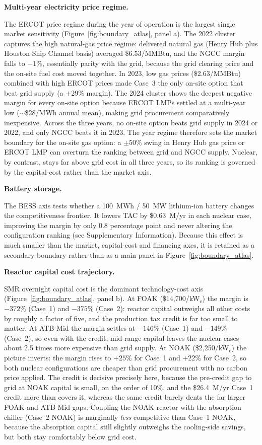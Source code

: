\documentclass[a4paper,fleqn]{cas-sc}
\newcommand{\runinhead}[1]{\par\smallskip\noindent\textbf{#1.}\quad}
\begin{document}
\runinhead{Multi-year electricity price regime}
\label{sec:results:year}

The ERCOT price regime during the year of operation is the largest single market sensitivity (Figure~\ref{fig:boundary_atlas}, panel a). The 2022 cluster captures the high natural-gas price regime: delivered natural gas (Henry Hub plus Houston Ship Channel basis) averaged \$6.53/MMBtu, and the NGCC margin falls to $-1\%$, essentially parity with the grid, because the grid clearing price and the on-site fuel cost moved together. In 2023, low gas prices (\$2.63/MMBtu) combined with high ERCOT prices made Case~3 the only on-site option that beat grid supply (a $+29\%$ margin). The 2024 cluster shows the deepest negative margin for every on-site option because ERCOT LMPs settled at a multi-year low ($\sim$\$28/MWh annual mean), making grid procurement comparatively inexpensive. Across the three years, no on-site option beats grid supply in 2024 or 2022, and only NGCC beats it in 2023. The year regime therefore sets the market boundary for the on-site gas option: a $\pm 50\%$ swing in Henry Hub gas price or ERCOT LMP can overturn the ranking between grid and NGCC supply. Nuclear, by contrast, stays far above grid cost in all three years, so its ranking is governed by the capital-cost rather than the market axis.

\runinhead{Battery storage}
\label{sec:results:bess}

The BESS axis tests whether a 100~MWh / 50~MW lithium-ion battery changes the competitiveness frontier. It lowers TAC by \$0.63~M/yr in each nuclear case, improving the margin by only 0.8 percentage point and never altering the configuration ranking (see Supplementary Information). Because this effect is much smaller than the market, capital-cost and financing axes, it is retained as a secondary boundary rather than as a main panel in Figure~\ref{fig:boundary_atlas}.

\runinhead{Reactor capital cost trajectory}
\label{sec:results:capex}

SMR overnight capital cost is the dominant technology-cost axis (Figure~\ref{fig:boundary_atlas}, panel b). At FOAK (\$14{,}700/kW$_\mathrm{e}$) the margin is $-372\%$ (Case~1) and $-375\%$ (Case~2): reactor capital outweighs all other costs by roughly a factor of five, and the production tax credit is far too small to matter. At ATB-Mid the margin settles at $-146\%$ (Case~1) and $-149\%$ (Case~2), so even with the credit, mid-range capital leaves the nuclear cases about 2.5 times more expensive than grid supply. At NOAK (\$2{,}250/kW$_\mathrm{e}$) the picture inverts: the margin rises to $+25\%$ for Case~1 and $+22\%$ for Case~2, so both nuclear configurations are cheaper than grid procurement with no carbon price applied. The credit is decisive precisely here, because the pre-credit gap to grid at NOAK capital is small, on the order of 10\%, and the \$26.4~M/yr Case~1 credit more than covers it, whereas the same credit barely dents the far larger FOAK and ATB-Mid gaps. Coupling the NOAK reactor with the absorption chiller (Case~2 NOAK) is marginally \emph{less} competitive than Case~1 NOAK, because the absorption capital still slightly outweighs the cooling-side savings, but both stay comfortably below grid cost.
\end{document}
